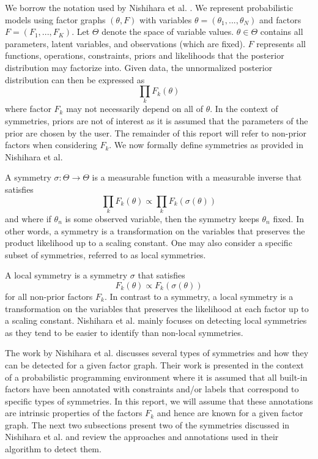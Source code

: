 We borrow the notation used by Nishihara et al. \cite{Nishihara:2013}. We represent probabilistic models using factor graphs $(\theta,F)$ with variables $\theta=(\theta_1,...,\theta_N)$ and factors $F=(F_1,...,F_K)$. Let $\Theta$ denote the space of variable values. $\theta\in\Theta$ contains all parameters, latent variables, and observations (which are fixed). $F$ represents all functions, operations, constraints, priors and likelihoods that the posterior distribution may factorize into. Given data, the unnormalized posterior distribution can then be expressed as
\[
\prod_kF_k(\theta)
\]
where factor $F_k$ may not necessarily depend on all of $\theta$. In the context of symmetries, priors are not of interest as it is assumed that the parameters of the prior are chosen by the user. The remainder of this report will refer to non-prior factors when considering $F_k$. We now formally define symmetries as provided in Nishihara et al.
\begin{defn}
A symmetry $\sigma:\Theta\rightarrow\Theta$ is a measurable function with a measurable inverse that satisfies
\[
\prod_kF_k(\theta) \propto \prod_kF_k(\sigma(\theta))
\]
and where if $\theta_n$ is some observed variable, then the symmetry keeps $\theta_n$ fixed. In other words, a symmetry is a transformation on the variables that preserves the product likelihood up to a scaling constant. One may also consider a specific subset of symmetries, referred to as local symmetries.
\end{defn}

\begin{defn}
A local symmetry is a symmetry $\sigma$ that satisfies
\[
F_k(\theta) \propto F_k\left(\sigma(\theta)\right)
\]
for all non-prior factors $F_k$. In contrast to a symmetry, a local symmetry is a transformation on the variables that preserves the likelihood at each factor up to a scaling constant. Nishihara et al. mainly focuses on detecting local symmetries as they tend to be easier to identify than non-local symmetries.
\end{defn}

The work by Nishihara et al. discusses several types of symmetries and how they can be detected for a given factor graph. Their work is presented in the context of a probabilistic programming environment where it is assumed that all built-in factors have been annotated with constraints and/or labels that correspond to specific types of symmetries. In this report, we will assume that these annotations are intrinsic properties of the factors $F_k$ and hence are known for a given factor graph. The next two subsections present two of the symmetries discussed in Nishihara et al. and review the approaches and annotations used in their algorithm to detect them.


